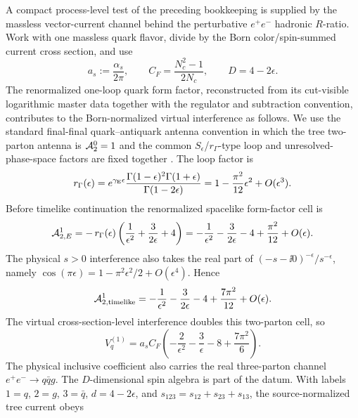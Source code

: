 \begin{controlledapproximation}
\label{ca:inclusive-current-form-factor-ratio-closure}
A compact process-level test of the preceding bookkeeping is supplied by the
massless vector-current channel behind the perturbative
\(e^+e^-\) hadronic \(R\)-ratio.  Work with one massless quark flavor,
divide by the Born color/spin-summed current cross section, and use
\[
  a_s:=\frac{\alpha_s}{2\pi},
  \qquad
  C_F=\frac{N_c^2-1}{2N_c},
  \qquad
  D=4-2\epsilon .
\]
The renormalized one-loop quark form factor, reconstructed from its
cut-visible logarithmic master data together with the regulator and
subtraction convention, contributes to the Born-normalized virtual
interference as follows.  We use the standard final-final
quark--antiquark antenna convention in which the tree two-parton antenna is
\({\cal A}_2^0=1\) and the common \(S_\epsilon\)/\(r_\Gamma\)-type loop and
unresolved-phase-space factors are fixed together
\cite{GehrmannDeRidderGehrmannGlover2005Antenna}.  The loop factor is
\[
  r_\Gamma(\epsilon)
  =
  e^{\gamma_{\rm E}\epsilon}
  \frac{\Gamma(1-\epsilon)^2\Gamma(1+\epsilon)}{\Gamma(1-2\epsilon)}
  =
  1-\frac{\pi^2}{12}\epsilon^2+O(\epsilon^3).
\]
Before timelike continuation the renormalized spacelike form-factor cell is
\[
  {\cal A}_{2,E}^1
  =
  -\,r_\Gamma(\epsilon)
  \left(
    \frac{1}{\epsilon^2}
    +\frac{3}{2\epsilon}
    +4
  \right)
  =
  -\frac{1}{\epsilon^2}
  -\frac{3}{2\epsilon}
  -4+\frac{\pi^2}{12}+O(\epsilon).
\]
The physical \(s>0\) interference also takes the real part of
\((-s-\ii0)^{-\epsilon}/s^{-\epsilon}\), namely
\(\cos(\pi\epsilon)=1-\pi^2\epsilon^2/2+O(\epsilon^4)\).  Hence
\[
  {\cal A}_{2,\rm timelike}^1
  =
  -\frac{1}{\epsilon^2}
  -\frac{3}{2\epsilon}
  -4+\frac{7\pi^2}{12}+O(\epsilon).
\]
The virtual cross-section-level interference doubles this two-parton cell, so
\begin{equation}
  V_q^{(1)}
  =
  a_s C_F
  \left(
    -\frac{2}{\epsilon^2}
    -\frac{3}{\epsilon}
    -8+\frac{7\pi^2}{6}
  \right).
  \label{eq:current-form-factor-virtual-interference}
\end{equation}
The physical inclusive coefficient also carries the real three-parton channel
\(e^+e^-\to q\bar q g\).  The \(D\)-dimensional spin algebra is part of the
datum.  With labels \(1=q\), \(2=g\), \(3=\bar q\), \(d=4-2\epsilon\), and
\(s_{123}=s_{12}+s_{23}+s_{13}\), the source-normalized tree current obeys
\cite{GehrmannDeRidderGehrmannGlover2004TwoJet,GehrmannDeRidderGehrmannGlover2005Antenna}

\end{controlledapproximation}
